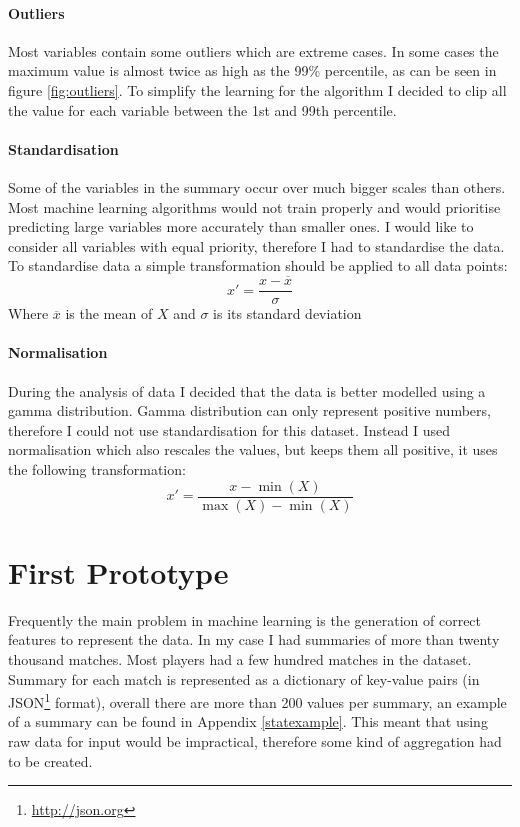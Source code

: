 \documentclass[12pt,a4paper]{book}
\newcommand\mean[1]{\overline{#1}}
\begin{document}
\paragraph{Outliers}
Most variables contain some outliers which are extreme cases.
In some cases the maximum value is almost twice as high as the 99\% percentile, as can be seen in figure \ref{fig:outliers}.
To simplify the learning for the algorithm I decided to clip all the value for each variable between the 1st and 99th percentile.
\paragraph{Standardisation}
Some of the variables in the summary occur over much bigger scales than others.
Most machine learning algorithms would not train properly and would prioritise predicting large variables more accurately than smaller ones.
I would like to consider all variables with equal priority, therefore I had to standardise the data.
To standardise data a simple transformation should be applied to all data points:
\begin{equation*}
x' = \frac{x - \mean{x}}{\sigma}
\end{equation*}
Where $\mean{x}$ is the mean of $X$ and $\sigma$ is its standard deviation
\paragraph{Normalisation}
During the analysis of data I decided that the data is better modelled using a gamma distribution.
Gamma distribution can only represent positive numbers, therefore I could not use standardisation for this dataset.
Instead I used normalisation which also rescales the values, but keeps them all positive, it uses the following transformation:
\begin{equation*}
x' = \frac{x - \min(X)}{\max(X)-\min(X)}
\end{equation*}
\section{First Prototype}
Frequently the main problem in machine learning is the generation of correct features to represent the data.
In my case I had summaries of more than twenty thousand matches.
Most players had a few hundred matches in the dataset.
Summary for each match is represented as a dictionary of key-value pairs (in JSON\footnote{\url{http://json.org}} format), overall there are more than 200 values per summary, an example of a summary can be found in Appendix \ref{statexample}.
This meant that using raw data for input would be impractical, therefore some kind of aggregation had to be created.
\end{document}

